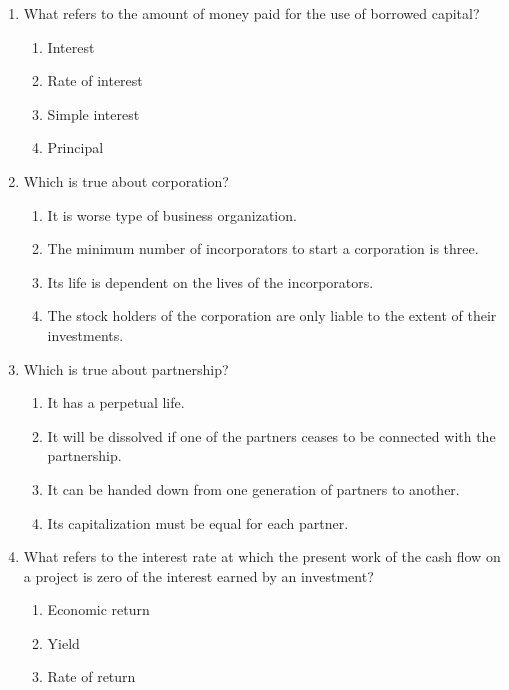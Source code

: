 \documentclass[11pt,a4paper]{article}
\begin{document}
\begin{enumerate}
{}
\\
\item{What refers to the amount of money paid for the use of borrowed capital?}
\begin{enumerate}[label=\Alph*.]
\item{Interest}
\item{Rate of interest}
\item{Simple interest}
\item{Principal}
\end{enumerate}
\item{Which is true about corporation?}
\begin{enumerate}[label=\Alph*.]
\item{It is worse type of business organization.}
\item{The minimum number of incorporators to start a corporation is three.}
\item{Its life is dependent on the lives of the incorporators.}
\item{The stock holders of the corporation are only liable to the extent of their investments.}
\end{enumerate}
\item{Which is true about partnership?}
\begin{enumerate}[label=\Alph*.]
\item{It has a perpetual life.}
\item{It will be dissolved if one of the partners ceases to be connected with the partnership.}
\item{It can be handed down from one generation of partners to another.}
\item{Its capitalization must be equal for each partner.}
\end{enumerate}
\item{What refers to the interest rate at which the present work of the cash flow on a project is zero of the interest earned by an investment?}
\begin{enumerate}[label=\Alph*.]
\item{Economic return}
\item{Yield}
\item{Rate of return}

\end{enumerate}
\end{enumerate}
\end{document}
